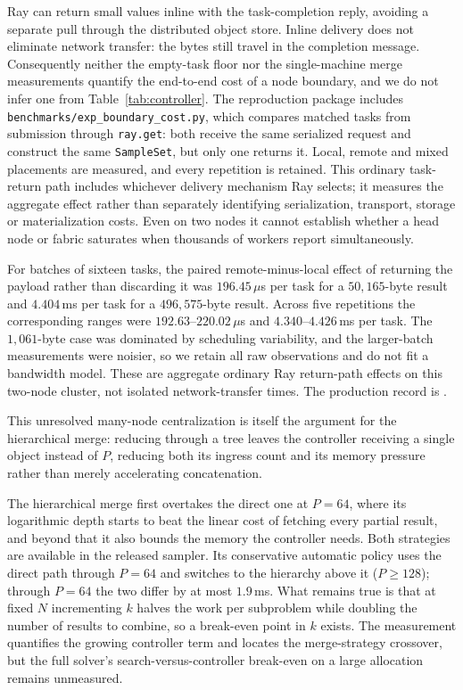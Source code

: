 \documentclass[preprint,12pt,a4paper]{elsarticle}
\begin{document}
Ray can return small values inline with the task-completion reply, avoiding a separate pull
through the distributed object store. Inline delivery does not eliminate network transfer: the
bytes still travel in the completion message. Consequently neither the empty-task floor nor the
single-machine merge measurements quantify the end-to-end cost of a node boundary, and we do
not infer one from Table~\ref{tab:controller}. The reproduction package includes
\texttt{benchmarks/exp\_boundary\_cost.py}, which compares matched tasks from submission through
\texttt{ray.get}: both receive the same serialized request and construct the same
\texttt{SampleSet}, but only one returns it. Local, remote and mixed placements are measured,
and every repetition is retained. This ordinary task-return path includes whichever delivery
mechanism Ray selects; it measures the aggregate effect rather than separately identifying
serialization, transport, storage or materialization costs. Even on two nodes it cannot
establish whether a head node or fabric saturates when thousands of workers report
simultaneously.

For batches of sixteen tasks, the paired remote-minus-local effect of returning the payload
rather than discarding it was $196.45$\,$\mu$s per task for a $50{,}165$-byte result and
$4.404$\,ms per task for a $496{,}575$-byte result. Across five repetitions the corresponding
ranges were $192.63$--$220.02$\,$\mu$s and $4.340$--$4.426$\,ms per task. The $1{,}061$-byte
case was dominated by scheduling variability, and the larger-batch measurements were noisier,
so we retain all raw observations and do not fit a bandwidth model. These are aggregate
ordinary Ray return-path effects on this two-node cluster, not isolated network-transfer
times. The production record is
.

This unresolved many-node centralization is itself the argument for the hierarchical merge: reducing
through a tree leaves the controller receiving a single object instead of $P$, reducing both
its ingress count and its memory pressure rather than merely accelerating concatenation.

The hierarchical merge first overtakes the direct one at $P=64$, where its
logarithmic depth starts to beat the linear cost of fetching every partial result,
and beyond that it also bounds the memory the controller needs. Both strategies are
available in the released sampler. Its conservative automatic policy uses the direct path
through $P=64$ and switches to the hierarchy above it ($P\geq128$); through $P=64$ the two
differ by at most $1.9$\,ms. What remains
true is that at fixed $N$ incrementing $k$ halves the work per subproblem while
doubling the number of results to combine, so a break-even point in $k$ exists. The
measurement quantifies the growing controller term and locates the merge-strategy
crossover, but the full solver's search-versus-controller break-even on a large allocation
remains unmeasured.
\end{document}
